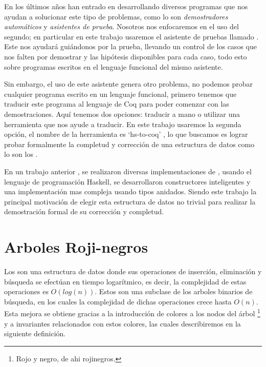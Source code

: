 En los últimos años han entrado en desarrollando diversos programas que nos ayudan a solucionar
este tipo de problemas, como lo son \textit{demostradores autom\'aticos} y \textit{asistentes de
prueba}. Nosotros nos enfocaremos en el uso del segundo; en particular en este trabajo usaremos el
asistente de pruebas llamado {\coq}. Este nos ayudar\'a gui\'andonos por la prueba, llevando un
control de los casos que nos falten por demostrar y las hip\'otesis disponibles para cada caso,
todo esto sobre programas escritos en el lenguaje funcional del mismo asistente.

Sin embargo, el uso de este asistente genera otro problema, no podemos probar cualquier programa
escrito en un lenguaje funcional, primero tenemos que traducir este programa al lenguaje de Coq
para poder comenzar con las demostraciones. Aquí tenemos dos opciones: traducir a mano o utilizar
una herramienta que nos ayude a traducir. En este trabajo usaremos la segunda opci\'on, el nombre
de la herramienta es `hs-to-coq' \cite{thrc}, lo que buscamos es lograr probar formalmente la
completud y correcci\'on de una estructura de datos como lo son los {\arns}.

En un trabajo anterior \cite{tesisG}, se realizaron diversas implementaciones de {\arns}, usando el
lenguaje de programaci\'on Haskell, se desarrollaron constructores inteligentes y una
implementaci\'on mas compleja usando tipos anidados. Siendo este trabajo la principal motivaci\'on
de elegir esta estructura de datos no trivial para realizar la demostraci\'on formal de su
corrección y completud.

\section{Arboles Roji-negros}
Los {\arns} son una estructura de datos donde sus operaciones de inserci\'on, eliminaci\'on y
búsqueda se efectúan en tiempo logarítmico, es decir, la complejidad de estas operaciones es
$O(log(n))$. Estos son una subclase de los arboles binarios de búsqueda, en los cuales la
complejidad de dichas operaciones crece hasta $O(n)$. Esta mejora  se obtiene gracias a la
introducción de colores a los nodos del \'arbol \footnote{Rojo y negro, de ahi rojinegros.} y a
invariantes relacionados con estos colores, las cuales describiremos en la siguiente definici\'on.

